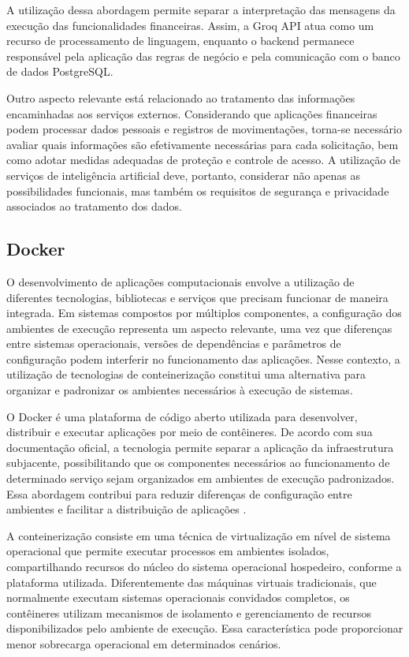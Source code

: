 A utilização dessa abordagem permite separar a interpretação das mensagens da execução das funcionalidades financeiras. Assim, a Groq API atua como um recurso de processamento de linguagem, enquanto o backend permanece responsável pela aplicação das regras de negócio e pela comunicação com o banco de dados PostgreSQL.

Outro aspecto relevante está relacionado ao tratamento das informações encaminhadas aos serviços externos. Considerando que aplicações financeiras podem processar dados pessoais e registros de movimentações, torna-se necessário avaliar quais informações são efetivamente necessárias para cada solicitação, bem como adotar medidas adequadas de proteção e controle de acesso. A utilização de serviços de inteligência artificial deve, portanto, considerar não apenas as possibilidades funcionais, mas também os requisitos de segurança e privacidade associados ao tratamento dos dados.

\subsection{Docker}

O desenvolvimento de aplicações computacionais envolve a utilização de diferentes tecnologias, bibliotecas e serviços que precisam funcionar de maneira integrada. Em sistemas compostos por múltiplos componentes, a configuração dos ambientes de execução representa um aspecto relevante, uma vez que diferenças entre sistemas operacionais, versões de dependências e parâmetros de configuração podem interferir no funcionamento das aplicações. Nesse contexto, a utilização de tecnologias de conteinerização constitui uma alternativa para organizar e padronizar os ambientes necessários à execução de sistemas.

O Docker é uma plataforma de código aberto utilizada para desenvolver, distribuir e executar aplicações por meio de contêineres. De acordo com sua documentação oficial, a tecnologia permite separar a aplicação da infraestrutura subjacente, possibilitando que os componentes necessários ao funcionamento de determinado serviço sejam organizados em ambientes de execução padronizados. Essa abordagem contribui para reduzir diferenças de configuração entre ambientes e facilitar a distribuição de aplicações \cite{docker_overview_2026}.

A conteinerização consiste em uma técnica de virtualização em nível de sistema operacional que permite executar processos em ambientes isolados, compartilhando recursos do núcleo do sistema operacional hospedeiro, conforme a plataforma utilizada. Diferentemente das máquinas virtuais tradicionais, que normalmente executam sistemas operacionais convidados completos, os contêineres utilizam mecanismos de isolamento e gerenciamento de recursos disponibilizados pelo ambiente de execução. Essa característica pode proporcionar menor sobrecarga operacional em determinados cenários.

